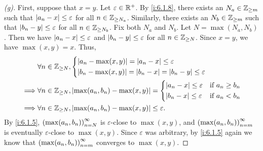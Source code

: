 \begin{proof}[(g)]
  First, suppose that \(x = y\).
  Let \(\varepsilon \in \mathbb{R}^+\).
  By \cref{i:6.1.8}, there exists an \(N_a \in \mathbb{Z}_{\geq m}\) such that \(\left\lvert a_n - x\right\rvert \leq \varepsilon\) for all \(n \in \mathbb{Z}_{\geq N_a}\).
  Similarly, there exists an \(N_b \in \mathbb{Z}_{\geq m}\) such that \(\left\lvert b_n - y\right\rvert \leq \varepsilon\) for all \(n \in \mathbb{Z}_{\geq N_b}\).
  Fix both \(N_a\) and \(N_b\).
  Let \(N = \max(N_a, N_b)\).
  Then we have \(\left\lvert a_n - x\right\rvert \leq \varepsilon\) and \(\left\lvert b_n - y\right\rvert \leq \varepsilon\) for all \(n \in \mathbb{Z}_{\geq N}\).
  Since \(x = y\), we have \(\max(x, y) = x\).
  Thus,
  \begin{align*}
             & \forall n \in \mathbb{Z}_{\geq N}, \begin{dcases}
                                            \left\lvert a_n - \max(x, y)\right\rvert = \left\lvert a_n - x\right\rvert \leq \varepsilon \\
                                            \left\lvert b_n - \max(x, y)\right\rvert = \left\lvert b_n - x\right\rvert = \left\lvert b_n - y\right\rvert \leq \varepsilon
                                          \end{dcases}                       \\
    \implies & \forall n \in \mathbb{Z}_{\geq N}, \left\lvert\max(a_n, b_n) - \max(x, y)\right\rvert = \begin{dcases}
                                                                                \left\lvert a_n - x\right\rvert \leq \varepsilon & \text{if } a_n \geq b_n \\
                                                                                \left\lvert b_n - x\right\rvert \leq \varepsilon & \text{if } a_n < b_n
                                                                              \end{dcases} \\
    \implies & \forall n \in \mathbb{Z}_{\geq N}, \left\lvert\max(a_n, b_n) - \max(x, y)\right\rvert \leq \varepsilon.
  \end{align*}
  By \cref{i:6.1.5}, \(\left\lparen\max(a_n, b_n)\right\rparen_{n = N}^\infty\) is \(\varepsilon\)-close to \(\max(x, y)\), and \(\left\lparen\max(a_n, b_n)\right\rparen_{n = m}^\infty\) is eventually \(\varepsilon\)-close to \(\max(x, y)\).
  Since \(\varepsilon\) was arbitrary, by \cref{i:6.1.5} again we know that \(\left\lparen\max(a_n, b_n)\right\rparen_{n = m}^\infty\) converges to \(\max(x, y)\).


\end{proof}
